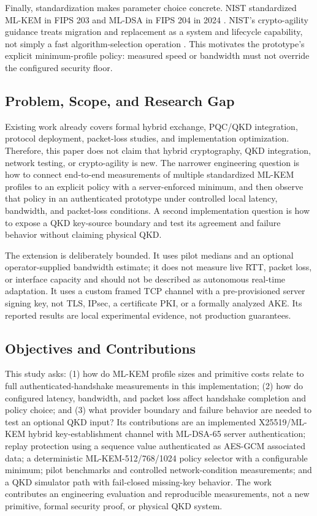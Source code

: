 \documentclass[journal]{IEEEtran}
\begin{document}
Finally, standardization makes parameter choice concrete. NIST standardized ML-KEM in FIPS 203 and ML-DSA in FIPS 204 in 2024 \cite{nist203,nist204}. NIST's crypto-agility guidance treats migration and replacement as a system and lifecycle capability, not simply a fast algorithm-selection operation \cite{nistAgility}. This motivates the prototype's explicit minimum-profile policy: measured speed or bandwidth must not override the configured security floor.

\subsection{Problem, Scope, and Research Gap}
Existing work already covers formal hybrid exchange, PQC/QKD integration, protocol deployment, packet-loss studies, and implementation optimization. Therefore, this paper does not claim that hybrid cryptography, QKD integration, network testing, or crypto-agility is new. The narrower engineering question is how to connect end-to-end measurements of multiple standardized ML-KEM profiles to an explicit policy with a server-enforced minimum, and then observe that policy in an authenticated prototype under controlled local latency, bandwidth, and packet-loss conditions. A second implementation question is how to expose a QKD key-source boundary and test its agreement and failure behavior without claiming physical QKD.

The extension is deliberately bounded. It uses pilot medians and an optional operator-supplied bandwidth estimate; it does not measure live RTT, packet loss, or interface capacity and should not be described as autonomous real-time adaptation. It uses a custom framed TCP channel with a pre-provisioned server signing key, not TLS, IPsec, a certificate PKI, or a formally analyzed AKE. Its reported results are local experimental evidence, not production guarantees.

\subsection{Objectives and Contributions}
This study asks: (1) how do ML-KEM profile sizes and primitive costs relate to full authenticated-handshake measurements in this implementation; (2) how do configured latency, bandwidth, and packet loss affect handshake completion and policy choice; and (3) what provider boundary and failure behavior are needed to test an optional QKD input? Its contributions are an implemented X25519/ML-KEM hybrid key-establishment channel with ML-DSA-65 server authentication; replay protection using a sequence value authenticated as AES-GCM associated data; a deterministic ML-KEM-512/768/1024 policy selector with a configurable minimum; pilot benchmarks and controlled network-condition measurements; and a QKD simulator path with fail-closed missing-key behavior. The work contributes an engineering evaluation and reproducible measurements, not a new primitive, formal security proof, or physical QKD system.
\end{document}
